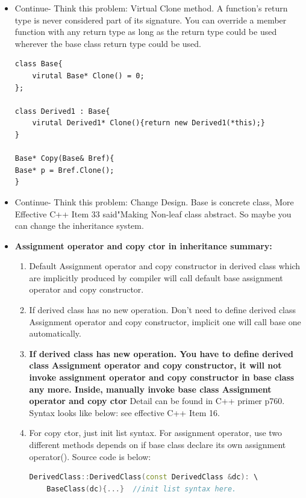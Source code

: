 \documentclass[a4paper,11pt,twoside]{book}
\begin{document}
\begin{itemize}
\item Continue- Think this problem: Virtual Clone method.
	A function's return type is never considered part of its signature. You can override a member function with any return type as long as the return type could be used wherever the base class return type could be used.
\begin{lstlisting}[numbers=none]
class Base{
	virutal Base* Clone() = 0;
};
	
class Derived1 : Base{
	virutal Derived1* Clone(){return new Derived1(*this);}
}
	
Base* Copy(Base& Bref){
Base* p = Bref.Clone();
}
\end{lstlisting}
	
	\item Continue- Think this problem: Change Design. Base is concrete class,  More Effective C++ Item 33 said"Making Non-leaf class abstract. So maybe you can change the inheritance system.
	
	\item \textbf{Assignment operator and copy ctor in inheritance summary:}
	\begin{enumerate}
		\item Default Assignment  operator and  copy constructor in derived class which are implicitly produced by compiler will call default base assignment operator and  copy constructor.
		
		\item If derived class has no new operation. Don't need to define derived class Assignment  operator and  copy constructor, implicit one will call base one automatically.
		
		\item \textbf{If derived class has new operation. You have to define derived class Assignment  operator and  copy constructor, it will not invoke assignment  operator and  copy constructor in base class any more.  Inside, manually invoke base class Assignment operator and copy ctor } Detail can be found in C++ primer p760. Syntax looks like below: see effective C++ Item 16.
		
		\item For copy ctor, just init list syntax. For assignment operator, use two different methods depends on if base class declare its own assignment operator(). Source code is below:
		
\begin{lstlisting}[frame=single, language=c++]
DerivedClass::DerivedClass(const DerivedClass &dc): \
	BaseClass(dc){...}  //init list syntax here.
		

\end{lstlisting}
\end{enumerate}
\end{itemize}
\end{document}

